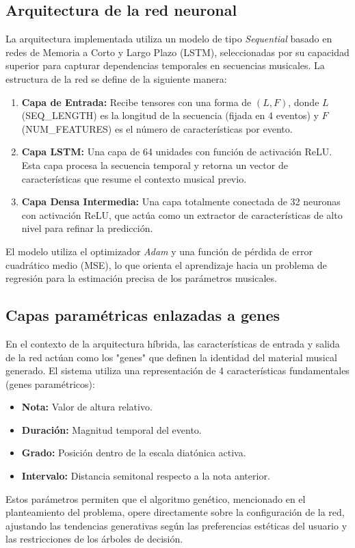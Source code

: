 \documentclass[12pt]{report}
\begin{document}
\subsection{Arquitectura de la red neuronal}
La arquitectura implementada utiliza un modelo de tipo \textit{Sequential} basado en redes de Memoria a Corto y Largo Plazo (LSTM), seleccionadas por su capacidad superior para capturar dependencias temporales en secuencias musicales. La estructura de la red se define de la siguiente manera:

\begin{enumerate}
    \item \textbf{Capa de Entrada:} Recibe tensores con una forma de $(L, F)$, donde $L$ (SEQ\_LENGTH) es la longitud de la secuencia (fijada en 4 eventos) y $F$ (NUM\_FEATURES) es el número de características por evento.
    \item \textbf{Capa LSTM:} Una capa de 64 unidades con función de activación ReLU. Esta capa procesa la secuencia temporal y retorna un vector de características que resume el contexto musical previo.
    \item \textbf{Capa Densa Intermedia:} Una capa totalmente conectada de 32 neuronas con activación ReLU, que actúa como un extractor de características de alto nivel para refinar la predicción.
\end{enumerate}

El modelo utiliza el optimizador \textit{Adam} y una función de pérdida de error cuadrático medio (MSE), lo que orienta el aprendizaje hacia un problema de regresión para la estimación precisa de los parámetros musicales.

\subsection{Capas paramétricas enlazadas a genes}
En el contexto de la arquitectura híbrida, las características de entrada y salida de la red actúan como los "genes" que definen la identidad del material musical generado. El sistema utiliza una representación de 4 características fundamentales (genes paramétricos):
\begin{itemize}
    \item \textbf{Nota:} Valor de altura relativo.
    \item \textbf{Duración:} Magnitud temporal del evento.
    \item \textbf{Grado:} Posición dentro de la escala diatónica activa.
    \item \textbf{Intervalo:} Distancia semitonal respecto a la nota anterior.
\end{itemize}
Estos parámetros permiten que el algoritmo genético, mencionado en el planteamiento del problema, opere directamente sobre la configuración de la red, ajustando las tendencias generativas según las preferencias estéticas del usuario y las restricciones de los árboles de decisión.
\end{document}
